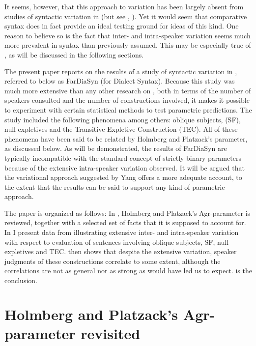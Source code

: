 \documentclass[output=paper]{LSP/langsci}
\begin{document}
It seems, however, that this approach to variation has been largely absent from studies of syntactic variation in  (but see \citealt{Thráinsson2013variation}, \citealt{Nowenstein2014}). Yet it would seem that comparative  syntax does in fact provide an ideal testing ground for ideas of this kind. One reason to believe so is the fact that inter- and intra-speaker variation seems much more prevalent in  syntax than previously assumed. This may be especially true of , as will be discussed in the following sections.

The present paper reports on the results of a study of syntactic variation in , referred to below as FarDiaSyn (for  Dialect Syntax). Because this study was much more extensive than any other research on , both in terms of the number of speakers consulted and the number of constructions involved, it makes it possible to experiment with certain statistical methods to test parametric predictions. The study included the following phenomena among others: oblique subjects,  (SF), null expletives and the Transitive Expletive Construction (TEC). All of these phenomena have been said to be related by Holmberg and Platzack’s  parameter, as discussed below. As will be demonstrated, the results of FarDiaSyn are typically incompatible with the standard concept of strictly binary parameters because of the extensive intra-speaker variation observed. It will be argued that the variational approach suggested by Yang offers a more adequate account, to the extent that the results can be said to support any kind of parametric approach.

The paper is organized as follows: In , Holmberg and Platzack’s Agr-para\-meter is reviewed, together with a selected set of facts that it is supposed to account for. In  I present data from  illustrating extensive inter- and intra-speaker variation with respect to evaluation of sentences involving oblique subjects, SF, null expletives and TEC.  then shows that despite the extensive variation, speaker judgments of these constructions correlate to some extent, although the correlations are not as general nor as strong as \citet{Holmplat1995} would have led us to expect.  is the conclusion.

\section{Holmberg and Platzack’s Agr-parameter revisited}\label{sec:Thrainsson:2}
\end{document}
